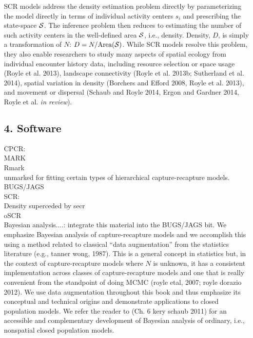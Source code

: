 \documentclass{book}
\begin{document}
SCR models address the density estimation problem directly by parameterizing
the model directly in terms of individual activity centers $s_i$ and
prescribing the state-space ${\cal S}$. The inference problem then
reduces to estimating the number of such activity centers in the
well-defined area ${\cal S}$, i.e., density.  Density, $D$, is simply a
transformation of $N$:  $D =  N/\mbox{Area}({\cal S})$.
While SCR models resolve
this problem, they also enable researchers to study many aspects of
spatial ecology from individual encounter history data, including
resource selection or space usage (Royle et al. 2013), landscape
connectivity (Royle et al. 2013b; Sutherland et al. 2014), spatial
variation in density (Borchers and Efford 2008, Royle et al. 2013),
and movement or dispersal (Schaub and Royle 2014, Ergon and Gardner
2014, Royle et al. {\it in review}). 

\subsection*{4. Software}

CPCR:\\
  MARK\\
  Rmark\\
  unmarked for fitting certain types of hierarchical capture-recapture models.\\
  BUGS/JAGS\\
SCR:\\
  Density superceded by secr\\
  oSCR\\

Bayesian analysis....: integrate this material into the BUGS/JAGS
bit. 
We emphasize Bayesian analysis of capture-recapture models and we
accomplish this using a method related to classical ``data
augmentation'' from the statistics literature (e.g., tanner wong, 1987).  This is a general concept in
statistics but, in the context of capture-recapture models where $N$
is unknown, it has a consistent implementation across classes of
capture-recapture models and one that is really convenient from the
standpoint of doing MCMC
(royle etal, 2007; royle dorazio 2012). We use data augmentation
throughout this book and thus emphasize its conceptual and technical
origins and demonstrate applications to closed population models.  We
refer the reader to (Ch. 6 kery schaub 2011) for an
accessible and complementary development of Bayesian analysis of
ordinary, i.e., nonspatial closed population models.
\end{document}
